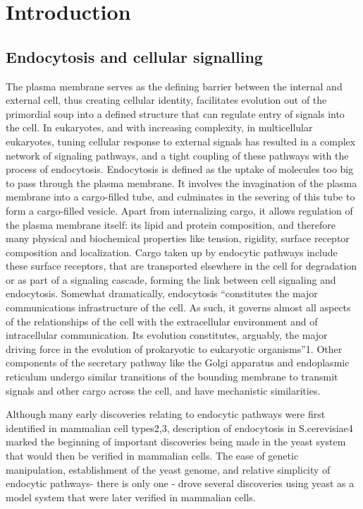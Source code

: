 \chapter{Introduction} %

\label{Ch:Aims} %

\section{Endocytosis and cellular signalling}
The plasma membrane serves as the defining barrier between the internal and external cell, thus creating cellular identity, facilitates evolution out of the primordial soup into a defined structure that can regulate entry of signals into the cell. In eukaryotes, and with increasing complexity, in multicellular eukaryotes, tuning cellular response to external signals has resulted in a complex network of signaling pathways, and a tight coupling of these pathways with the process of endocytosis. Endocytosis is defined as the uptake of molecules too big to pass through the plasma membrane. It involves the invagination of the plasma membrane into a cargo-filled tube, and culminates in the severing of this tube to form a cargo-filled vesicle. Apart from internalizing cargo, it allows regulation of the plasma membrane itself: its lipid and protein composition, and therefore many physical and biochemical properties like tension, rigidity, surface receptor composition and localization. Cargo taken up by endocytic pathways include these surface receptors, that are transported elsewhere in the cell for degradation or as part of a signaling cascade, forming the link between cell signaling and endocytosis.  
Somewhat dramatically, endocytosis “constitutes the major communications infrastructure of the cell. As such, it governs almost all aspects of the relationships of the cell with the extracellular environment and of intracellular communication. Its evolution constitutes, arguably, the major driving force in the evolution of prokaryotic to eukaryotic organisms”1. 
Other components of the secretary pathway like the Golgi apparatus and endoplasmic reticulum undergo similar transitions of the bounding membrane to transmit signals and other cargo across the cell, and have mechanistic similarities. \par 

\vspace{5mm}
Although many early discoveries relating to endocytic pathways were first identified in mammalian cell types2,3, description of endocytosis in S.cerevisiae4 marked the beginning of important discoveries being made in the yeast system that would then be verified in mammalian cells. The ease of genetic manipulation, establishment of the yeast genome, and relative simplicity of endocytic pathways- there is only one -
 drove several discoveries using yeast as a model system that were later verified in mammalian cells.



